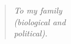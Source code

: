 \begin{verse}
\begin{flushright}
\vspace*{3cm}
\textit{To my family\\ 
	(biological and\\
	 political).}
\end{flushright}
\end{verse}
